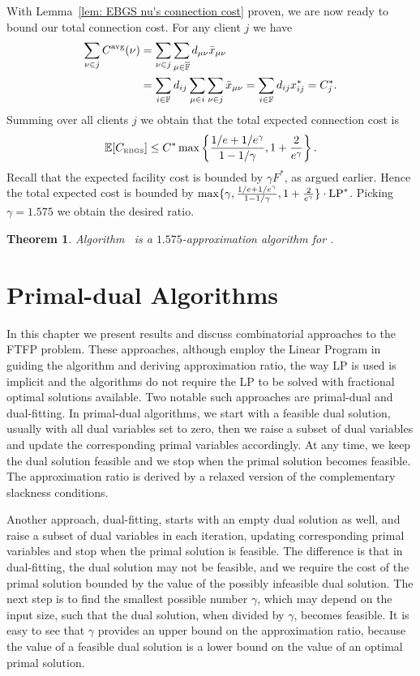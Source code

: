 \documentclass[oneside,final]{ucr}
\newtheorem{theorem}{Theorem}
\begin{document}
With Lemma~\ref{lem: EBGS nu's connection cost} proven, we are now ready to bound our total connection cost.
For any client $j$ we have
%
\begin{align*}
\sum_{\nu\in j} C^{{\mbox{\scriptsize\rm avg}}}(\nu)
	&= \sum_{\nu\in j}\sum_{\mu\in\overline{\mathbb{F}}} d_{\mu\nu}{\bar x}_{\mu\nu} 
	\\
	&= \sum_{i\in\mathbb{F}}d_{ij}\sum_{\mu\in i}\sum_{\nu\in j} {\bar x}_{\mu\nu}
	= \sum_{i\in\mathbb{F}} d_{ij}x_{ij}^\ast = C_j^\ast.
\end{align*}
% 
Summing over all clients $j$ we obtain that the total expected connection cost is
%
\begin{equation*}
	\mathbb{E}[ C_{\mbox{\tiny\rm EBGS}} ] \le  C^\ast\max\left\{\frac{1/e+1/e^\gamma}{1-1/\gamma}, 1+\frac{2}{e^\gamma}\right\}.
\end{equation*}
%
Recall that the expected facility cost is bounded by $\gamma F^\ast$,
as argued earlier. Hence the total expected cost is bounded by $\max\{\gamma,
\frac{1/e+1/e^\gamma}{1-1/\gamma}, 1+\frac{2}{e^\gamma}\}\cdot
\mbox{\rm LP}^\ast$. Picking $\gamma=1.575$ we obtain the desired ratio.


\begin{theorem}\label{thm:ebgs}
  Algorithm~{\EBGS} is a $1.575$-approximation algorithm for \FTFP.
\end{theorem}

\chapter{Primal-dual Algorithms} \label{ch: primal-dual} In
this chapter we present results and discuss combinatorial
approaches to the FTFP problem. These approaches, although
employ the Linear Program in guiding the algorithm and
deriving approximation ratio, the way LP is used is
implicit and the algorithms do not require the LP to be
solved with fractional optimal solutions available. Two
notable such approaches are primal-dual and dual-fitting. In
primal-dual algorithms, we start with a feasible dual
solution, usually with all dual variables set to zero, then
we raise a subset of dual variables and update the
corresponding primal variables accordingly. At any time, we
keep the dual solution feasible and we stop when the primal
solution becomes feasible. The approximation ratio is
derived by a relaxed version of the complementary slackness
conditions.

Another approach, dual-fitting, starts with an empty dual
solution as well, and raise a subset of dual variables in
each iteration, updating corresponding primal variables and
stop when the primal solution is feasible. The difference is
that in dual-fitting, the dual solution may not be feasible,
and we require the cost of the primal solution bounded by
the value of the possibly infeasible dual solution. The next
step is to find the smallest possible number $\gamma$, which
may depend on the input size, such that the dual solution,
when divided by $\gamma$, becomes feasible. It is easy to
see that $\gamma$ provides an upper bound on the
approximation ratio, because the value of a feasible dual
solution is a lower bound on the value of an optimal primal
solution.
\end{document}
